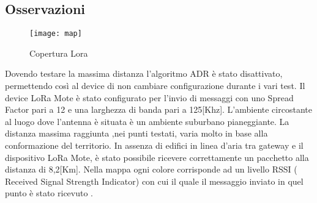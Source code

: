\subsection{Osservazioni}

\begin{figure}[h]
        \centering 
                \texttt{[image: map]}
        \caption{Copertura Lora}
        \label{fig:map}
\end{figure}
Dovendo testare la massima distanza l'algoritmo ADR è stato disattivato,
permettendo così al device di non cambiare configurazione durante i vari test.
Il device LoRa Mote è stato configurato 
per l'invio di messaggi con uno Spread Factor pari a 12 e una larghezza
di banda pari a 125[Khz]. L'ambiente circostante
al luogo dove l'antenna è situata è un ambiente suburbano pianeggiante.
La distanza massima raggiunta ,nei punti testati, varia molto in base alla
conformazione del territorio. In assenza di edifici in linea d'aria tra gateway
e il dispositivo LoRa Mote, è stato possibile ricevere correttamente un pacchetto alla distanza 
di 8,2[Km].
Nella mappa ogni colore corrisponde ad un livello  RSSI ( Received
Signal Strength Indicator) con cui il quale il messaggio inviato in quel punto è stato ricevuto .

